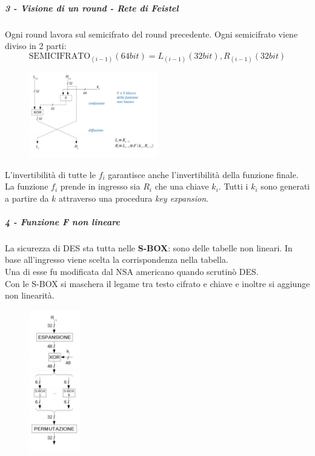 \documentclass[a4paper,12pt]{article}
\begin{document}
\subparagraph{3 - Visione di un round - Rete di Feistel}
Ogni round lavora sul semicifrato del round precedente. Ogni semicifrato viene diviso in 2 parti:
$$ \text{SEMICIFRATO}_{(i-1)} (64 bit) = L_{(i-1)} (32 bit), R_{(i-1)} (32 bit) $$
\begin{figure}[H]
	\centering
	\includegraphics[width=0.5\textwidth]{img/visione-round-des.png}
\end{figure}
L'invertibilità di tutte le $f_i$ garantisce anche l'invertibilità della funzione finale. La funzione $f_i$ prende in ingresso sia $R_i$ che una chiave $k_i$.
Tutti i $k_i$ sono generati a partire da $k$ attraverso una procedura \textit{key expansion}.

\subparagraph{4 - Funzione F non lineare}
La sicurezza di DES sta tutta nelle \textbf{S-BOX}: sono delle tabelle non lineari. In base all'ingresso viene scelta la corrispondenza nella tabella. \\
Una di esse fu modificata dal NSA americano quando scrutinò DES. \\
Con le S-BOX si maschera il legame tra testo cifrato e chiave e inoltre si aggiunge non linearità. 
\begin{figure}[H]
	\centering
	\includegraphics[width=0.2\textwidth]{img/funzione-f-des.png}
\end{figure}
\end{document}
